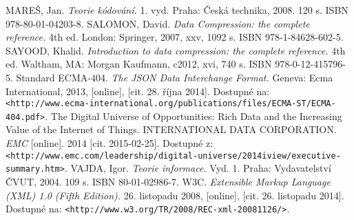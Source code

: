 \begin{thebibliography}{99}
 MAREŠ, Jan. {\em Teorie kódování.} 1. vyd. Praha: Česká technika, 2008. 120 s. ISBN 978-80-01-04203-8.
 SALOMON, David. {\em Data Compression: the complete reference.} 4th ed. London: Springer, 2007, xxv, 1092 s. ISBN 978-1-84628-602-5.
	SAYOOD, Khalid. {\em Introduction to data compression: the complete reference.} 4th ed. Waltham, MA: Morgan Kaufmann, c2012, xvi, 740 s. ISBN 978-0-12-415796-5.
 Standard ECMA-404. {\em The JSON Data Interchange Format.} Geneva: Ecma International, 2013, [online], [cit. 28. října 2014]. Dostupné na: {\tt <http://www.ecma-international.org/publications/files/ECMA-ST/ECMA-404.pdf>}.
 The Digital Universe of Opportunities: Rich Data and the Increasing Value of the Internet of Things. INTERNATIONAL DATA CORPORATION. {\em EMC} [online]. 2014 [cit. 2015-02-25]. Dostupné z: {\tt <http://www.emc.com/leadership/digital-universe/2014iview/executive-summary.htm>}.
 VAJDA, Igor. {\em Teorie informace.} Vyd. 1. Praha: Vydavatelství ČVUT, 2004. 109 s. ISBN 80-01-02986-7.
 W3C. {\em Extensible Markup Language (XML) 1.0 (Fifth Edition).} 26. listopadu 2008, [online], [cit. 26. listopadu 2014]. Dostupné na: {\tt <http://www.w3.org/TR/2008/REC-xml-20081126/>}.
\end{thebibliography}
